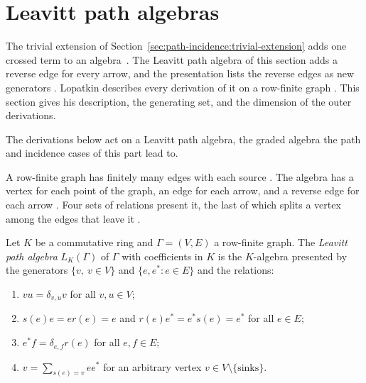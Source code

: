 \section{Leavitt path algebras}\label{sec:path-incidence:leavitt}

The trivial extension of Section~\ref{sec:path-incidence:trivial-extension}
adds one crossed term to an algebra~\cite[p.~59]{Lopatkin2019}. The Leavitt path algebra of this section
adds a reverse edge for every arrow, and the presentation lists the reverse
edges as new generators \cite[p.~61]{Lopatkin2019}. Lopatkin describes every
derivation of it on a row-finite graph \cite[p.~59]{Lopatkin2019}. This
section gives his description, the generating set, and the dimension of the
outer derivations.

The derivations below act on a Leavitt path algebra, the graded algebra the
path and incidence cases of this part lead to.

A row-finite graph has finitely many edges with each source
\cite[p.~60]{Lopatkin2019}. The algebra has a vertex for each point of the
graph, an edge for each arrow, and a reverse edge for each arrow
\cite[p.~61]{Lopatkin2019}. Four sets of relations present it, the last of
which splits a vertex among the edges that leave it
\cite[p.~61]{Lopatkin2019}.

\begin{definition}\label{def:leavitt:algebra}
Let $K$ be a commutative ring and $\Gamma=(V,E)$ a row-finite graph. The
\emph{Leavitt path algebra} $L_{K}(\Gamma)$ of $\Gamma$ with coefficients in $K$ is
the $K$-algebra presented by the generators $\{v,\ v\in V\}$ and
$\{e,e^{*}\colon e\in E\}$ and the relations:
\begin{enumerate}[label=(\arabic*)]
\item $vu=\delta_{v,u}v$ for all $v,u\in V$;
\item $s(e)e=er(e)=e$ and $r(e)e^{*}=e^{*}s(e)=e^{*}$ for all $e\in E$;
\item $e^{*}f=\delta_{e,f}r(e)$ for all $e,f\in E$;
\item $v=\sum_{s(e)=v}ee^{*}$ for an arbitrary vertex $v\in V\setminus\{\text{sinks}\}$.
\end{enumerate}
\end{definition}

